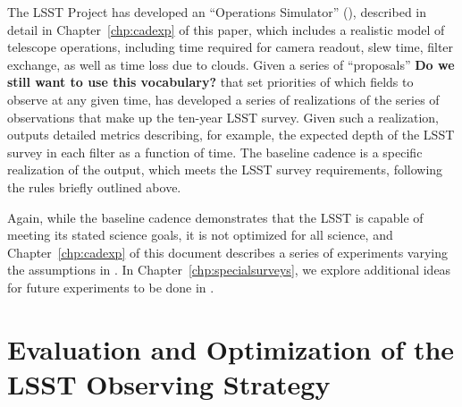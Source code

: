   The LSST Project has developed an ``Operations Simulator'' (\OpSim),
  described in detail in Chapter~\ref{chp:cadexp} of this paper, which includes a
  realistic model of telescope operations, including time required for
  camera readout, slew time, filter exchange, as well as time loss due
  to clouds.  Given a series of ``proposals'' {\bf Do we still want to
    use this vocabulary?} that set priorities of which fields to
  observe at any given time, \OpSim has developed a series of
  realizations of the series of observations that make up the ten-year
  LSST survey.  Given such a realization, \OpSim outputs detailed
  metrics describing, for example, the expected depth of the LSST
  survey in each filter as a function of time.  The baseline cadence
  is a specific realization of the \OpSim output, which meets the LSST
  survey requirements, following the rules briefly outlined above.  
   
  Again, while the baseline cadence demonstrates that the LSST is
  capable of meeting its stated science goals, it is not optimized for
  all science, and Chapter~\ref{chp:cadexp} of this document describes a series of
  experiments varying the assumptions in \OpSim.  In
  Chapter~\ref{chp:specialsurveys}, we explore additional ideas for
  future experiments to be done in \OpSim.  


\iffalse
THIS SECTION HAS BEEN ABSORBED INTO WHAT IS ABOVE.
\section{Beyond the Baseline Observing Strategy}
\def\secname{intro:baseline}\label{sec:\secname}

Optimizing the Observing Strategy: what perturbations are we
permitted to introduce, to maximize the system's science capabilities?
What are our constraints? And our opportunities?
\fi


\section{Evaluation and Optimization of the LSST Observing Strategy}
\def\secname{intro:evaluation}\label{sec:\secname}

